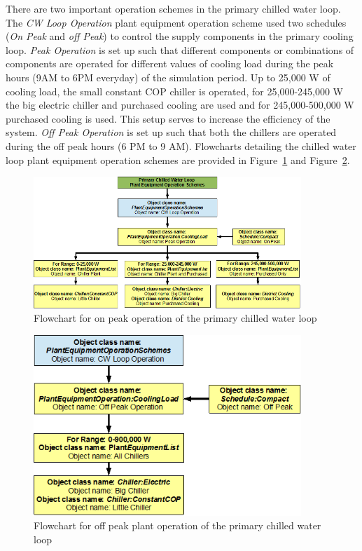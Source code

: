 There are two important operation schemes in the primary chilled water loop. The \emph{CW Loop Operation} plant equipment operation scheme used two schedules (\emph{On Peak} and \emph{off Peak}) to control the supply components in the primary cooling loop. \emph{Peak Operation} is set up such that different components or combinations of components are operated for different values of cooling load during the peak hours (9AM to 6PM everyday) of the simulation period. Up to 25,000 W of cooling load, the small constant COP chiller is operated, for 25,000-245,000 W the big electric chiller and purchased cooling are used and for 245,000-500,000 W purchased cooling is used. This setup serves to increase the efficiency of the system. \emph{Off Peak Operation} is set up such that both the chillers are operated during the off peak hours (6 PM to 9 AM). Flowcharts detailing the chilled water loop plant equipment operation schemes are provided in Figure~\ref{fig:flowchart-for-on-peak-operation-of} and Figure~\ref{fig:flowchart-for-off-peak-plant-operation-of}.

\begin{figure}[hbtp] %
\centering
\includegraphics[width=0.9\textwidth, height=0.9\textheight, keepaspectratio=true]{media/image100.png}
\caption{Flowchart for on peak operation of the primary chilled water loop \protect \label{fig:flowchart-for-on-peak-operation-of}}
\end{figure}

\begin{figure}[hbtp] %
\centering
\includegraphics[width=0.9\textwidth, height=0.9\textheight, keepaspectratio=true]{media/image101.png}
\caption{Flowchart for off peak plant operation of the primary chilled water loop \protect \label{fig:flowchart-for-off-peak-plant-operation-of}}
\end{figure}

